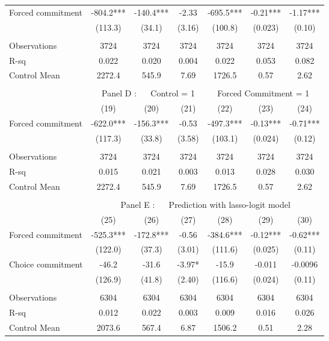\begin{tabular}{lcccccc}
\midrule
\midrule
Forced commitment  & -804.2*** & -140.4*** & -2.33 & -695.5*** & -0.21*** & -1.17*** \\
      & (113.3) & (34.1) & (3.16) & (100.8) & (0.023) & (0.10) \\
      &       &       &       &       &       &  \\
\midrule
Observations & 3724  & 3724  & 3724  & 3724  & 3724  & 3724 \\
R-sq  & 0.022 & 0.020 & 0.004 & 0.022 & 0.053 & 0.082 \\
Control Mean & 2272.4 & 545.9 & 7.69  & 1726.5 & 0.57  & 2.62 \\
\midrule
\midrule
      &       &       &       &       &       &  \\
\midrule
      & \multicolumn{6}{c}{Panel D : $\quad$ Control  = 1       $\quad\quad$                      Forced Commitment = 1} \\
\midrule
\midrule
      & (19)  & (20)  & (21)  & (22)  & (23)  & (24) \\
\midrule
\midrule
Forced commitment  & -622.0*** & -156.3*** & -0.53 & -497.3*** & -0.13*** & -0.71*** \\
      & (117.3) & (33.8) & (3.58) & (103.1) & (0.024) & (0.12) \\
      &       &       &       &       &       &  \\
\midrule
Observations & 3724  & 3724  & 3724  & 3724  & 3724  & 3724 \\
R-sq  & 0.015 & 0.021 & 0.003 & 0.013 & 0.028 & 0.030 \\
Control Mean & 2272.4 & 545.9 & 7.69  & 1726.5 & 0.57  & 2.62 \\
\midrule
\midrule
      &       &       &       &       &       &  \\
\midrule
      & \multicolumn{6}{c}{Panel E : $\quad$ Prediction with lasso-logit model} \\
\midrule
\midrule
      & (25)  & (26)  & (27)  & (28)  & (29)  & (30) \\
\midrule
\midrule
Forced commitment  & -525.3*** & -172.8*** & -0.56 & -384.6*** & -0.12*** & -0.62*** \\
      & (122.0) & (37.3) & (3.01) & (111.6) & (0.025) & (0.11) \\
Choice commitment & -46.2 & -31.6 & -3.97* & -15.9 & -0.011 & -0.0096 \\
      & (126.9) & (41.8) & (2.40) & (116.6) & (0.024) & (0.11) \\
      &       &       &       &       &       &  \\
\midrule
Observations & 6304  & 6304  & 6304  & 6304  & 6304  & 6304 \\
R-sq  & 0.012 & 0.022 & 0.003 & 0.009 & 0.016 & 0.026 \\
Control Mean & 2073.6 & 567.4 & 6.87  & 1506.2 & 0.51  & 2.28 \\
\bottomrule
\bottomrule
\end{tabular}%
